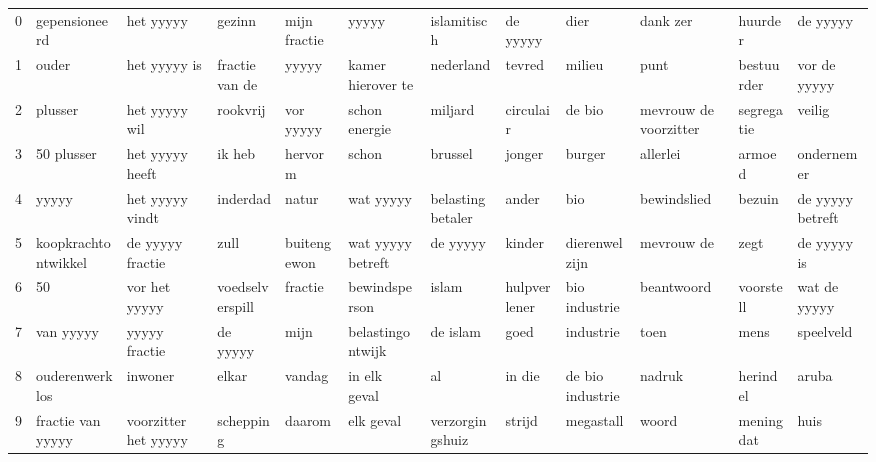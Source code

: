 \begin{tabular}{llllllllllll}
\toprule
0 &        gepensioneerd &             het yyyyy &           gezinn &  mijn fractie &              yyyyy &       islamitisch &      de yyyyy &              dier &               dank zer &     huurder &          de yyyyy \\
1 &                ouder &          het yyyyy is &   fractie van de &         yyyyy &  kamer hierover te &         nederland &        tevred &            milieu &                   punt &  bestuurder &      vor de yyyyy \\
2 &              plusser &         het yyyyy wil &         rookvrij &     vor yyyyy &      schon energie &           miljard &     circulair &            de bio &  mevrouw de voorzitter &  segregatie &            veilig \\
3 &           50 plusser &       het yyyyy heeft &           ik heb &       hervorm &              schon &           brussel &        jonger &            burger &               allerlei &      armoed &        ondernemer \\
4 &                yyyyy &       het yyyyy vindt &         inderdad &         natur &          wat yyyyy &  belastingbetaler &         ander &               bio &            bewindslied &      bezuin &  de yyyyy betreft \\
5 &  koopkrachtontwikkel &      de yyyyy fractie &             zull &   buitengewon &  wat yyyyy betreft &          de yyyyy &        kinder &     dierenwelzijn &             mevrouw de &        zegt &       de yyyyy is \\
6 &                   50 &         vor het yyyyy &  voedselverspill &       fractie &      bewindsperson &             islam &  hulpverlener &     bio industrie &             beantwoord &   voorstell &      wat de yyyyy \\
7 &            van yyyyy &         yyyyy fractie &         de yyyyy &          mijn &   belastingontwijk &          de islam &          goed &         industrie &                   toen &        mens &         speelveld \\
8 &       ouderenwerklos &               inwoner &            elkar &        vandag &       in elk geval &                al &        in die &  de bio industrie &                 nadruk &    herindel &             aruba \\
9 &    fractie van yyyyy &  voorzitter het yyyyy &        schepping &        daarom &          elk geval &   verzorgingshuiz &        strijd &         megastall &                  woord &  mening dat &              huis \\
\bottomrule
\end{tabular}
